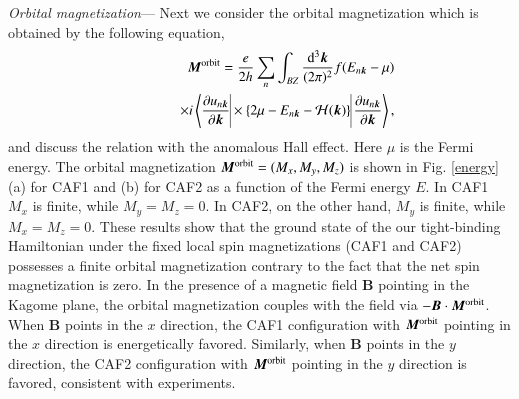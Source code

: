 \documentclass[letter,twocolumn,amsmath,amssymb,superscriptaddress]{jpsj3}
\newcommand{\vB}{\bm{B}}
\newcommand{\vM}{\bm{M}}
\newcommand{\vk}{\bm{k}}
\begin{document}
{\it Orbital magnetization}---
Next we consider the orbital magnetization which is obtained by the following equation\cite{Ceresoli2006,Xiao2010},
\begin{eqnarray}
 &&\vM^{\rm orbit}=\frac{e}{2h}\sum_n\int_{BZ}\frac{\mathrm{d}^3\vk}{(2\pi)^2}f(E_{n\vk}-\mu)
 \nonumber \\
 &&\qquad\quad \times i\left<\frac{\partial u_{n\vk}}{\partial\vk}\vline
 \times\left\{2\mu-E_{n\vk}-\mathcal{H}(\vk)\right\}\vline\frac{\partial u_{n\vk}}{\partial\vk}\right>,
\label{orbital magnetization}
\end{eqnarray}
and discuss the relation with the anomalous Hall effect.
Here $\mu$ is the Fermi energy.
%
The orbital magnetization $\vM^{\rm orbit}=(M_x,M_y,M_z)$ is shown in Fig. \ref{energy} (a) for CAF1 and (b) for CAF2 as a function of the Fermi energy $E$.
In CAF1 $M_x$ is finite, while $M_y=M_z=0$. In CAF2, on the other hand, $M_y$ is finite, while $M_x=M_z=0$.
These results show that the ground state of the our tight-binding Hamiltonian under the fixed local spin magnetizations (CAF1 and CAF2) possesses a finite orbital magnetization contrary to the fact that the net spin magnetization is zero.
In the presence of a magnetic field $\vB$ pointing in the Kagome plane, the orbital magnetization couples with the field\cite{Xiao2010,Ceresoli2006} via 
$-\vB\cdot\vM^{\rm orbit}$.
When $\vB$ points in the $x$ direction, the CAF1 configuration with $\vM^{\rm orbit}$ pointing in the $x$ direction is energetically favored.
Similarly, when $\vB$ points in the $y$ direction, the CAF2 configuration with $\vM^{\rm orbit}$ pointing in the $y$ direction is favored, consistent with experiments\cite{Nakatsuji2015,Nayak2015,Kiyohara2016,Li2017}.
\end{document}
